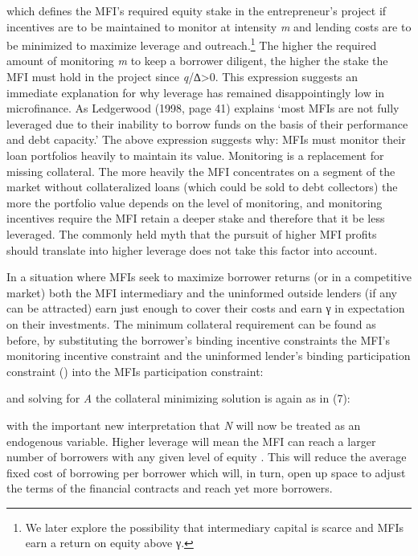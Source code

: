 \documentclass{article}
\begin{document}

which defines the MFI's required equity stake in the entrepreneur's
project if incentives are to be maintained to monitor at intensity
\emph{m} and lending costs are to be minimized to maximize leverage and
outreach.\footnote{We later explore the possibility that intermediary
  capital is scarce and MFIs earn a return on equity above γ.} The
higher the required amount of monitoring \emph{m} to keep a borrower
diligent, the higher the stake the MFI must hold in the project since
\emph{q}/∆\textgreater{}0. This expression suggests an immediate
explanation for why leverage has remained disappointingly low in
microfinance. As Ledgerwood (1998, page 41) explains `most MFIs are not
fully leveraged due to their inability to borrow funds on the basis of
their performance and debt capacity.' The above expression suggests why:
MFIs must monitor their loan portfolios heavily to maintain its value.
Monitoring is a replacement for missing collateral. The more heavily the
MFI concentrates on a segment of the market without collateralized loans
(which could be sold to debt collectors) the more the portfolio value
depends on the level of monitoring, and monitoring incentives require
the MFI retain a deeper stake and therefore that it be less leveraged.
The commonly held myth that the pursuit of higher MFI profits should
translate into higher leverage does not take this factor into account.

In a situation where MFIs seek to maximize borrower returns (or in a
competitive market) both the MFI intermediary and the uninformed outside
lenders (if any can be attracted) earn just enough to cover their costs
and earn γ in expectation on their investments. The minimum collateral
requirement can be found as before, by substituting the borrower's
binding incentive constraints the MFI's monitoring incentive constraint
and the uninformed lender's binding participation constraint () into the
MFIs participation constraint:

and solving for \emph{A} the collateral minimizing solution is again as
in (7):

with the important new interpretation that \emph{N} will now be treated
as an endogenous variable. Higher leverage will mean the MFI can reach a
larger number of borrowers with any given level of equity . This will
reduce the average fixed cost of borrowing per borrower which will, in
turn, open up space to adjust the terms of the financial contracts and
reach yet more borrowers.
\end{document}
